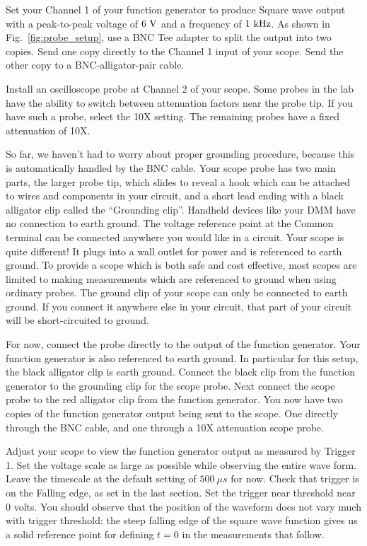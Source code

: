 Set your Channel 1 of your function generator to produce Square wave
output with a peak-to-peak voltage of $6~\rm V$ and a frequency of
$1~\rm kHz$.  As shown in Fig.~\ref{fig:probe_setup}, use a BNC Tee adapter
to split the output into two copies.  Send one copy directly to the
Channel 1 input of your scope.  Send the other copy to a
BNC-alligator-pair cable.  

Install an oscilloscope probe at Channel 2 of your scope.  Some probes
in the lab have the ability to switch between attenuation factors near
the probe tip.  If you have such a probe, select the 10X setting.  The
remaining probes have a fixed attenuation of 10X.

So far, we haven't had to worry about proper grounding procedure,
because this is automatically handled by the BNC cable.  Your scope
probe has two main parts, the larger probe tip, which slides to reveal
a hook which can be attached to wires and components in your circuit,
and a short lead ending with a black alligator clip called the
``Grounding clip''.  Handheld devices like your DMM have no connection
to earth ground.  The voltage reference point at the Common terminal
can be connected anywhere you would like in a circuit.  Your scope is
quite different!  It plugs into a wall outlet for power and is
referenced to earth ground.  To provide a scope which is both safe and
cost effective, most scopes are limited to making measurements which
are referenced to ground when using ordinary probes.  The ground clip
of your scope can only be connected to earth ground.  If you connect
it anywhere else in your circuit, that part of your circuit will be
short-circuited to ground.

For now, connect the probe directly to the output of the
function generator.  Your function generator is also referenced to
earth ground.  In particular for this setup, the black alligator clip
is earth ground.  Connect the black clip from the function generator
to the grounding clip for the scope probe.  Next connect the scope
probe to the red alligator clip from the function generator.  You now
have two copies of the function generator output being sent to the
scope.  One directly through the BNC cable, and one through a 10X
attenuation scope probe.

Adjust your scope to view the function generator output as measured by
Trigger 1.  Set the voltage scale as large as possible while observing
the entire wave form.  Leave the timescale at the default setting of
$500~\mu s$ for now.  Check that trigger is on the Falling edge, as set
in the last section.  Set the trigger near threshold near 0 volts.
You should observe that the position of the waveform does not vary
much with trigger threshold: the steep falling edge of the square wave
function gives us a solid reference point for defining $t=0$ in the
measurements that follow.

